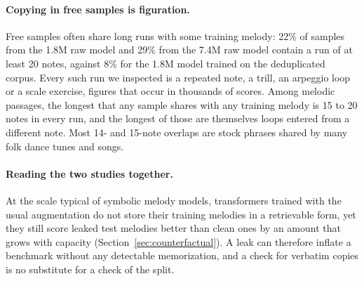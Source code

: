 \paragraph{Copying in free samples is figuration.} Free samples often share long runs with some training melody: 22\% of samples from the 1.8M raw model and 29\% from the 7.4M raw model contain a run of at least 20 notes, against 8\% for the 1.8M model trained on the deduplicated corpus. Every such run we inspected is a repeated note, a trill, an arpeggio loop or a scale exercise, figures that occur in thousands of scores. Among melodic passages, the longest that any sample shares with any training melody is 15 to 20 notes in every run, and the longest of those are themselves loops entered from a different note. Most 14- and 15-note overlaps are stock phrases shared by many folk dance tunes and songs.

\paragraph{Reading the two studies together.} At the scale typical of symbolic melody models, transformers trained with the usual augmentation do not store their training melodies in a retrievable form, yet they still score leaked test melodies better than clean ones by an amount that grows with capacity (Section~\ref{sec:counterfactual}). A leak can therefore inflate a benchmark without any detectable memorization, and a check for verbatim copies is no substitute for a check of the split.
